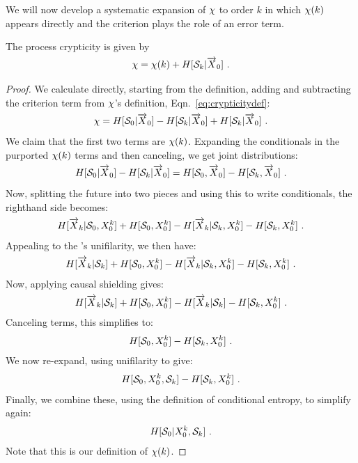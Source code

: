 We will now develop a systematic expansion of $\chi$ to order $k$ in which
$\chi(k)$ appears directly and the  criterion plays the
role of an error term.

\begin{The}
The process crypticity is given by
\begin{align}
\chi = \chi(k) + H[\mathcal{S}_k | \smash{\overrightarrow{{X}}}_0] ~.
\label{eq:CrypticityExpansion}
\end{align}
\label{thm:OKCC}
\end{The}

\begin{proof}
We calculate directly, starting from the definition, adding and subtracting
the  criterion term from $\chi$'s definition,
Eqn.~\ref{eq:crypticitydef}:
\begin{align*}
\chi = H[\mathcal{S}_0 | \smash{\overrightarrow{{X}}}_0] - H[\mathcal{S}_k | \smash{\overrightarrow{{X}}}_0]
		+ H[\mathcal{S}_k | \smash{\overrightarrow{{X}}}_0] ~.
\end{align*}
We claim that the first two terms are $\chi(k)$. Expanding the conditionals in
the purported $\chi(k)$ terms and then canceling, we get joint distributions:
\begin{align*}
H[\mathcal{S}_0 | \smash{\overrightarrow{{X}}}_0] - H[\mathcal{S}_k | \smash{\overrightarrow{{X}}}_0]
= H[\mathcal{S}_0,  \smash{\overrightarrow{{X}}}_0] - H[\mathcal{S}_k, \smash{\overrightarrow{{X}}}_0] ~.
\end{align*}
Now, splitting the future into two pieces and using this to write
conditionals, the righthand side becomes:
\begin{align*}
H[\smash{\overrightarrow{{X}}}_k | \mathcal{S}_0, {X}_0^k]
	+ H[\mathcal{S}_0, {X}_0^k]
	- H[\smash{\overrightarrow{{X}}}_k | \mathcal{S}_k, {X}_0^k]
	- H[\mathcal{S}_k, {X}_0^k] ~.
\end{align*}
Appealing to the \eM's unifilarity, we then have:
\begin{align*}
H[\smash{\overrightarrow{{X}}}_k | \mathcal{S}_k] + H[\mathcal{S}_0, {X}_0^k]
	- H[\smash{\overrightarrow{{X}}}_k | \mathcal{S}_k, {X}_0^k]
	- H[\mathcal{S}_k, {X}_0^k] ~.
\end{align*}
Now, applying causal shielding gives:
\begin{align*}
H[\smash{\overrightarrow{{X}}}_k | \mathcal{S}_k] + H[\mathcal{S}_0, {X}_0^k]
	- H[\smash{\overrightarrow{{X}}}_k | \mathcal{S}_k]
	- H[\mathcal{S}_k, {X}_0^k] ~.
\end{align*}
Canceling terms, this simplifies to:
\begin{align*}
H[\mathcal{S}_0, {X}_0^k] - H[\mathcal{S}_k, {X}_0^k] ~.
\end{align*}
We now re-expand, using unifilarity to give:
\begin{align*}
H[\mathcal{S}_0, {X}_0^k, \mathcal{S}_k]
	- H[\mathcal{S}_k, {X}_0^k] ~.
\end{align*}
Finally, we combine these, using the definition of conditional entropy, to
simplify again:
\begin{align*}
H[\mathcal{S}_0 | {X}_0^k, \mathcal{S}_k] ~.
\end{align*}
Note that this is our definition of $\chi(k)$.


\end{proof}
